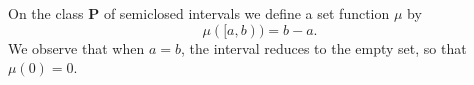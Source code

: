 On the class $\mathbf{P}$ of semiclosed intervals we define a set function $\mu$ by
$$\mu([a,b)) = b - a.$$
We observe that when $a = b$, the interval reduces to the empty set, so that $\mu(0) = 0$.
